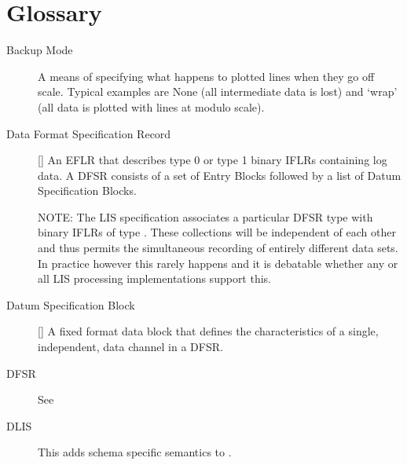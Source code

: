 \documentclass[letterpaper,10pt,english]{sphinxmanual}
\begin{document}
\section{Glossary}
\label{\detokenize{glossary::doc}}\label{\detokenize{glossary:glossary}}\begin{description}
\item[{Backup Mode}] \leavevmode{}\label{\detokenize{glossary:term-backup-mode}}
A means of specifying what happens to plotted lines when they go off scale. Typical examples are None (all intermediate data is lost) and ‘wrap’ (all data is plotted with lines at modulo scale).

\item[{Data Format Specification Record}] \leavevmode{}\label{\detokenize{glossary:term-data-format-specification-record}}
{[}{\hyperref[\detokenize{glossary:term-lis}]{}}{]} An EFLR that describes type 0 or type 1 binary IFLRs containing log data. A DFSR consists of a set of Entry Blocks followed by a list of Datum Specification Blocks.

NOTE: The LIS specification associates a particular DFSR type  with binary IFLRs of type . These collections will be independent of each other and thus permits the simultaneous recording of entirely different data sets. In practice however this rarely happens and it is debatable whether any or all LIS processing implementations support this.

\item[{Datum Specification Block}] \leavevmode{}\label{\detokenize{glossary:term-datum-specification-block}}
{[}{\hyperref[\detokenize{glossary:term-lis}]{}}{]} A fixed format data block that defines the characteristics of a single, independent, data channel in a DFSR.

\item[{DFSR}] \leavevmode{}\label{\detokenize{glossary:term-dfsr}}
See {\hyperref[\detokenize{glossary:term-data-format-specification-record}]{}}

\item[{DLIS}] \leavevmode{}\label{\detokenize{glossary:term-dlis}}
This adds schema specific semantics to {\hyperref[\detokenize{glossary:term-rp66}]{}}.


\end{description}
\end{document}
